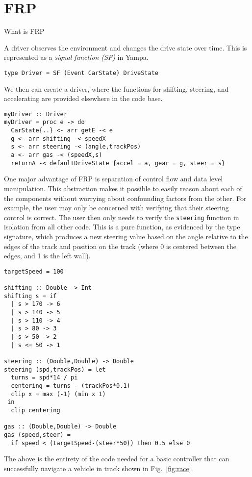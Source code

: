 \section{FRP}

What is FRP

A driver observes the environment and changes the drive state over time.
This is represented as a \textit{signal function (SF)} in Yampa.

\begin{lstlisting}
type Driver = SF (Event CarState) DriveState
\end{lstlisting}

We then can create a driver, where the functions for shifting, steering, and accelerating are provided elsewhere in the code base.

\begin{lstlisting}
myDriver :: Driver
myDriver = proc e -> do
  CarState{..} <- arr getE -< e
  g <- arr shifting -< speedX
  s <- arr steering -< (angle,trackPos)
  a <- arr gas -< (speedX,s)
  returnA -< defaultDriveState {accel = a, gear = g, steer = s}
\end{lstlisting}

One major advantage of FRP is separation of control flow and data level manipulation. 
This abstraction makes it possible to easily reason about each of the components without worrying about confounding factors from the other.
For example, the user may only be concerned with verifying that their steering control is correct.
The user then only needs to verify the \texttt{steering} function in isolation from all other code.
This is a pure function, as evidenced by the type signature, which produces a new steering value based on the angle relative to the edges of the track and position on the track (where 0 is centered between the edges, and 1 is the left wall).

\begin{lstlisting}
targetSpeed = 100

shifting :: Double -> Int
shifting s = if 
  | s > 170 -> 6
  | s > 140 -> 5
  | s > 110 -> 4
  | s > 80 -> 3
  | s > 50 -> 2
  | s <= 50 -> 1
 
steering :: (Double,Double) -> Double
steering (spd,trackPos) = let
  turns = spd*14 / pi
  centering = turns - (trackPos*0.1)
  clip x = max (-1) (min x 1)
 in
  clip centering
  
gas :: (Double,Double) -> Double
gas (speed,steer) = 
  if speed < (targetSpeed-(steer*50)) then 0.5 else 0
\end{lstlisting}

The above is the entirety of the code needed for a basic controller that can successfully navigate a vehicle in track shown in Fig.~\ref{fig:race}.
